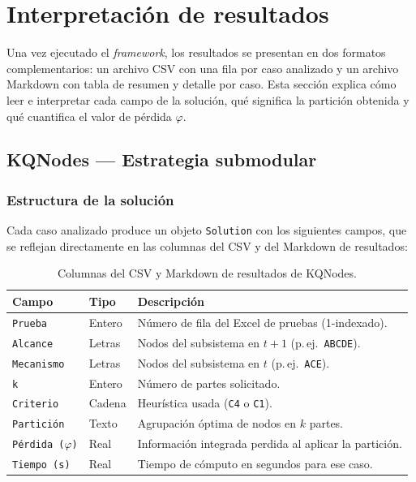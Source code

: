
\section{Interpretación de resultados}

Una vez ejecutado el \textit{framework}, los resultados se presentan en dos formatos
complementarios: un archivo CSV con una fila por caso analizado y un archivo Markdown
con tabla de resumen y detalle por caso. Esta sección explica cómo leer e interpretar
cada campo de la solución, qué significa la partición obtenida y qué cuantifica el valor
de pérdida $\varphi$.

\subsection{KQNodes — Estrategia submodular}
\label{sec:interpretacion_kqnodes}

\subsubsection{Estructura de la solución}

Cada caso analizado produce un objeto \texttt{Solution} con los siguientes campos,
que se reflejan directamente en las columnas del CSV y del Markdown de resultados:

\begin{table}[h!]
\centering
\begin{tabular}{|l|l|p{7.5cm}|}
\hline
\textbf{Campo} & \textbf{Tipo} & \textbf{Descripción} \\
\hline
\texttt{Prueba}        & Entero   & Número de fila del Excel de pruebas (1-indexado). \\
\texttt{Alcance}       & Letras   & Nodos del subsistema en $t+1$ (p.\,ej.\ \texttt{ABCDE}). \\
\texttt{Mecanismo}     & Letras   & Nodos del subsistema en $t$ (p.\,ej.\ \texttt{ACE}). \\
\texttt{k}             & Entero   & Número de partes solicitado. \\
\texttt{Criterio}      & Cadena   & Heurística usada (\texttt{C4} o \texttt{C1}). \\
\texttt{Partición}     & Texto    & Agrupación óptima de nodos en $k$ partes. \\
\texttt{Pérdida ($\varphi$)} & Real & Información integrada perdida al aplicar la partición. \\
\texttt{Tiempo (s)}    & Real     & Tiempo de cómputo en segundos para ese caso. \\
\hline
\end{tabular}
\caption{Columnas del CSV y Markdown de resultados de KQNodes.}
\label{tab:campos_solucion_kqnodes}
\end{table}

